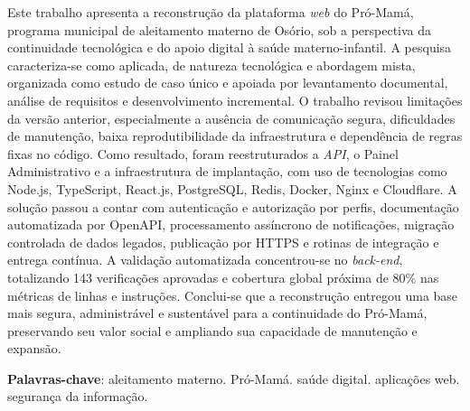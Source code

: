 \setlength{\absparsep}{18pt} %
\begin{resumo}
	Este trabalho apresenta a reconstrução da plataforma \emph{web} do Pró-Mamá, programa municipal de aleitamento materno de Osório, sob a perspectiva da continuidade tecnológica e do apoio digital à saúde materno-infantil. A pesquisa caracteriza-se como aplicada, de natureza tecnológica e abordagem mista, organizada como estudo de caso único e apoiada por levantamento documental, análise de requisitos e desenvolvimento incremental. O trabalho revisou limitações da versão anterior, especialmente a ausência de comunicação segura, dificuldades de manutenção, baixa reprodutibilidade da infraestrutura e dependência de regras fixas no código. Como resultado, foram reestruturados a \emph{API}, o Painel Administrativo e a infraestrutura de implantação, com uso de tecnologias como Node.js, TypeScript, React.js, PostgreSQL, Redis, Docker, Nginx e Cloudflare. A solução passou a contar com autenticação e autorização por perfis, documentação automatizada por OpenAPI, processamento assíncrono de notificações, migração controlada de dados legados, publicação por HTTPS e rotinas de integração e entrega contínua. A validação automatizada concentrou-se no \emph{back-end}, totalizando 143 verificações aprovadas e cobertura global próxima de 80\% nas métricas de linhas e instruções. Conclui-se que a reconstrução entregou uma base mais segura, administrável e sustentável para a continuidade do Pró-Mamá, preservando seu valor social e ampliando sua capacidade de manutenção e expansão.
	
	\textbf{Palavras-chave}: aleitamento materno. Pró-Mamá. saúde digital. aplicações web. segurança da informação.
\end{resumo}
